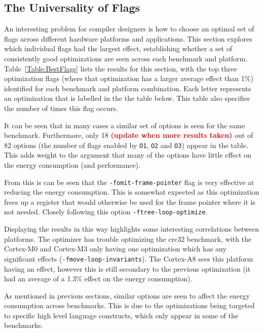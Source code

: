 \documentclass[twocolumn]{article}
\newcommand{\todo}[1]{\textbf{\textcolor{red}{#1}}}
\begin{document}

\subsection{The Universality of Flags}

An interesting problem for compiler designers is how to choose an optimal set of flags across different hardware platforms and applications. This section explores which individual flags had the largest effect, establishing whether a set of consistently good optimizations are seen across each benchmark and platform. Table~\ref{Table:BestFlags} lists the results for this section, with the top three optimization flags (where that optimization has a larger average effect than 1\%) identified for each benchmark and platform combination.  Each letter represents an optimization that is labelled in the the table below. This table also specifies the number of times this flag occurs.

It can be seen that in many cases a similar set of options is seen for the same benchmark. Furthermore, only 18 \todo{(update when more results taken)} out of 82 options (the number of flags enabled by \texttt{O1}, \texttt{O2} and \texttt{O3}) appear in the table. This adds weight to the argument that many of the options have little effect on the energy consumption (and performance).

From this is can be seen that the \texttt{-fomit-frame-pointer} flag is very effective at reducing the energy consumption. This is somewhat expected as this optimization frees up a register that would otherwise be used for the frame pointer where it is not needed. Closely following this option \texttt{-ftree-loop-optimize}.

Displaying the results in this way highlights some interesting correlations between platforms. The optimizer has trouble optimizing the crc32 benchmark, with the Cortex-M0 and Cortex-M3 only having one optimization which has any significant effects (\texttt{-fmove-loop-invariants}). The Cortex-A8 sees this platform having an effect, however this is still secondary to the previous optimization (it had an average of a 1.3\% effect on the energy consumption).

As mentioned in previous sections, similar options are seen to affect the energy consumption across benchmarks. This is due to the optimizations being targeted to specific high level language constructs, which only appear in some of the benchmarks.
\end{document}
